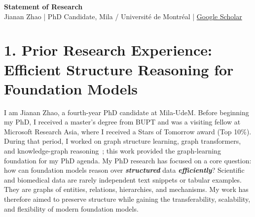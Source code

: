\documentclass[10pt,letterpaper]{article}
\newcommand{\urlScholar}{https://scholar.google.com/citations?user=Pb_UoYwAAAAJ}
\begin{document}
\pagestyle{empty}

\begin{center}
{\Large \textbf{Statement of Research}}\\[-0.05em]
{\normalsize Jianan Zhao \quad | \quad PhD Candidate, Mila / Universit\'e de Montr\'eal \quad | \quad \href{\urlScholar}{Google Scholar}}
\end{center}
\vspace{-0.55em}

\section*{1. Prior Research Experience: Efficient Structure Reasoning for Foundation Models}
I am Jianan Zhao, a fourth-year PhD candidate at Mila-UdeM. Before beginning my PhD, I received a master's degree from BUPT and was a visiting fellow at Microsoft Research Asia, where I received a Stars of Tomorrow award (Top 10\%). During that period, I worked on graph structure learning, graph transformers, and knowledge-graph reasoning~\cite{gsr,house,gophormer,mvse,hgsl,nshe}; this work provided the graph-learning foundation for my PhD agenda. My PhD research has focused on a core question: how can foundation models reason over \textbf{\textit{structured}} data \textbf{\textit{efficiently}}? Scientific and biomedical data are rarely independent text snippets or tabular examples. They are graphs of entities, relations, hierarchies, and mechanisms. My work has therefore aimed to preserve structure while gaining the transferability, scalability, and flexibility of modern foundation models. 
\end{document}
